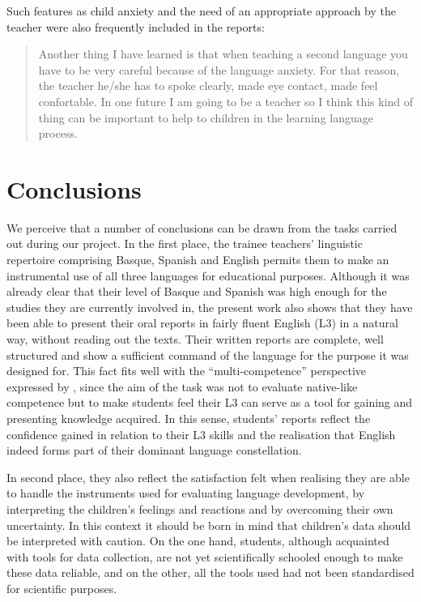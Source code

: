 \documentclass[output=paper]{../langscibook}
\begin{document}
Such features as child anxiety and the need of an appropriate approach by the teacher were also frequently included in the reports:

\begin{quote}
Another thing I have learned is that when teaching a second language you have to be very careful because of the language anxiety. For that reason, the teacher he/she has to spoke clearly, made eye contact, made feel confortable. In one future I am going to be a teacher so I think this kind of thing can be important to help to children in the learning language process.
\end{quote}

 \section{Conclusions}


We perceive that a number of conclusions can be drawn from the tasks carried out during our project. In the first place, the trainee teachers’ linguistic repertoire comprising Basque, Spanish and English permits them to make an instrumental use of all three languages for educational purposes. Although it was already clear that their level of Basque and Spanish was high enough for the studies they are currently involved in, the present work also shows that they have been able to present their oral reports in fairly fluent English (L3) in a natural way, without reading out the texts. Their written reports are complete, well structured and show a sufficient command of the language for the purpose it was designed for. This fact fits well with the “multi-competence” perspective expressed by \citet{Aronin2016}, since the aim of the task was not to evaluate native-like competence but to make students feel their L3 can serve as a tool for gaining and presenting knowledge acquired. In this sense, students’ reports reflect the confidence gained in relation to their L3 skills and the realisation that English indeed forms part of their dominant language constellation.

In second place, they also reflect the satisfaction felt when realising they are able to handle the instruments used for evaluating language development, by interpreting the children’s feelings and reactions and by overcoming their own uncertainty. In this context it should be born in mind that children’s data should be interpreted with caution. On the one hand, students, although acquainted with tools for data collection, are not yet scientifically schooled enough to make these data reliable, and on the other, all the tools used had not been standardised for scientific purposes.
\end{document}
